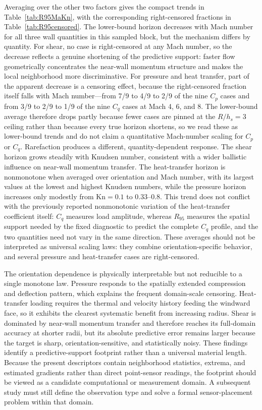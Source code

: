 \documentclass[aip,pof,preprint,floatfix,amsmath,amssymb]{revtex4-2}
\newcommand{\Kn}{\mathrm{Kn}}
\begin{document}
Averaging over the other two factors gives the compact trends in Table~\ref{tab:R95MaKn}, with the corresponding right-censored fractions in Table~\ref{tab:R95censored}. The lower-bound horizon decreases with Mach number for all three wall quantities in this sampled block, but the mechanism differs by quantity. For shear, no case is right-censored at any Mach number, so the decrease reflects a genuine shortening of the predictive support: faster flow geometrically concentrates the near-wall momentum structure and makes the local neighborhood more discriminative. For pressure and heat transfer, part of the apparent decrease is a censoring effect, because the right-censored fraction itself falls with Mach number---from 7/9 to 4/9 to 2/9 of the nine $C_p$ cases and from 3/9 to 2/9 to 1/9 of the nine $C_q$ cases at Mach 4, 6, and 8. The lower-bound average therefore drops partly because fewer cases are pinned at the $R/h_s=3$ ceiling rather than because every true horizon shortens, so we read these as lower-bound trends and do not claim a quantitative Mach-number scaling for $C_p$ or $C_q$.  Rarefaction produces a different, quantity-dependent response. The shear horizon grows steadily with Knudsen number, consistent with a wider ballistic influence on near-wall momentum transfer. The heat-transfer horizon is nonmonotone when averaged over orientation and Mach number, with its largest values at the lowest and highest Knudsen numbers, while the pressure horizon increases only modestly from $\Kn=0.1$ to 0.33--0.8. This trend does not conflict with the previously reported nonmonotonic variation of the heat-transfer coefficient itself: $C_q$ measures load amplitude, whereas $R_{95}$ measures the spatial support needed by the fixed diagnostic to predict the complete $C_q$ profile, and the two quantities need not vary in the same direction. These averages should not be interpreted as universal scaling laws: they combine orientation-specific behavior, and several pressure and heat-transfer cases are right-censored.

The orientation dependence is physically interpretable but not reducible to a single monotone law. Pressure responds to the spatially extended compression and deflection pattern, which explains the frequent domain-scale censoring. Heat-transfer loading requires the thermal and velocity history feeding the windward face, so it exhibits the clearest systematic benefit from increasing radius. Shear is dominated by near-wall momentum transfer and therefore reaches its full-domain accuracy at shorter radii, but its absolute predictive error remains larger because the target is sharp, orientation-sensitive, and statistically noisy. These findings identify a predictive-support footprint rather than a universal material length. Because the present descriptors contain neighborhood statistics, extrema, and estimated gradients rather than direct point-sensor readings, the footprint should be viewed as a candidate computational or measurement domain. A subsequent study must still define the observation type and solve a formal sensor-placement problem within that domain.
\end{document}
